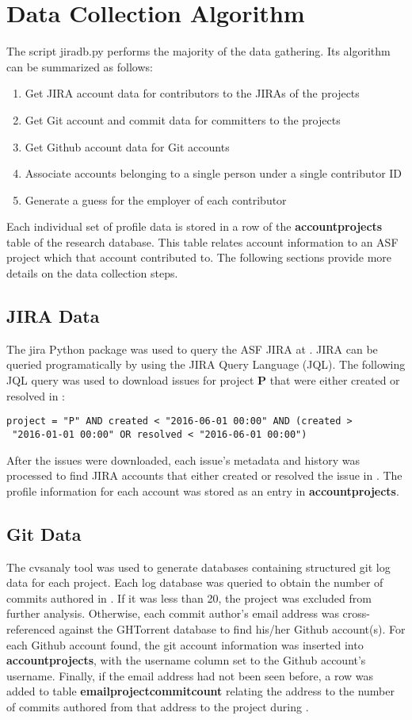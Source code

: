\section{Data Collection Algorithm}
The script jiradb.py performs the majority of the data gathering. Its algorithm can be summarized as follows:
\begin{enumerate}
	\item Get JIRA account data for contributors to the JIRAs of the projects
	\item Get Git account and commit data for committers to the projects
	\item Get Github account data for Git accounts 
	\item Associate accounts belonging to a single person under a single contributor ID  
	\item Generate a guess for the employer of each contributor  
\end{enumerate}

Each individual set of profile data is stored in a row of the \textbf{accountprojects} table of the research database. This table relates account information to an ASF project which that account contributed to. The following sections provide more details on the data collection steps.

\subsection{JIRA Data}
The jira Python package was used to query the ASF JIRA at \ASFJIRAURL. JIRA can be queried programatically by using the JIRA Query Language (JQL). The following JQL query was used to download issues for project \textbf{P} that were either created or resolved in \timeperiod:
\begin{lstlisting}
project = "P" AND created < "2016-06-01 00:00" AND (created >
 "2016-01-01 00:00" OR resolved < "2016-06-01 00:00")
\end{lstlisting}
After the issues were downloaded, each issue's metadata and history was processed to find JIRA accounts that either created or resolved the issue in \timeperiod. The profile information for each account was stored as an entry in \textbf{accountprojects}.
\subsection{Git Data}
The cvsanaly tool was used to generate databases containing structured git log data for each project. Each log database was queried to obtain the number of commits authored in \timeperiod. If it was less than 20, the project was excluded from further analysis. Otherwise, each commit author's email address was cross-referenced against the GHTorrent database to find his/her Github account(s). For each Github account found, the git account information was inserted into \textbf{accountprojects}, with the username column set to the Github account's username. Finally, if the email address had not been seen before, a row was added to table \textbf{emailprojectcommitcount} relating the address to the number of commits authored from that address to the project during \timeperiod.
